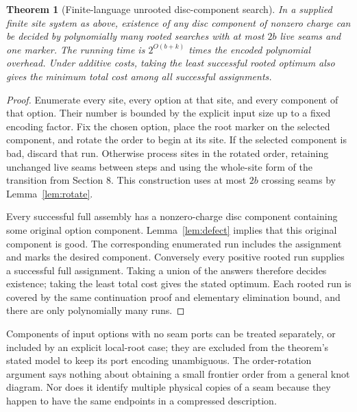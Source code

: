 \documentclass[11pt,letterpaper]{article}
\newtheorem{theorem}{Theorem}[section]
\theoremstyle{definition}
\begin{document}
\begin{theorem}[Finite-language unrooted disc-component search]\label{thm:unrooted}
In a supplied finite site system as above, existence of any disc component of nonzero charge can be decided by polynomially many rooted searches with at most $2b$ live seams and one marker. The running time is $2^{O(b+k)}$ times the encoded polynomial overhead. Under additive costs, taking the least successful rooted optimum also gives the minimum total cost among all successful assignments.
\end{theorem}
\begin{proof}
Enumerate every site, every option at that site, and every component of that option. Their number is bounded by the explicit input size up to a fixed encoding factor. Fix the chosen option, place the root marker on the selected component, and rotate the order to begin at its site. If the selected component is bad, discard that run. Otherwise process sites in the rotated order, retaining unchanged live seams between steps and using the whole-site form of the transition from Section 8. This construction uses at most $2b$ crossing seams by Lemma~\ref{lem:rotate}.

Every successful full assembly has a nonzero-charge disc component containing some original option component. Lemma~\ref{lem:defect} implies that this original component is good. The corresponding enumerated run includes the assignment and marks the desired component. Conversely every positive rooted run supplies a successful full assignment. Taking a union of the answers therefore decides existence; taking the least total cost gives the stated optimum. Each rooted run is covered by the same continuation proof and elementary elimination bound, and there are only polynomially many runs.
\end{proof}

Components of input options with no seam ports can be treated separately, or included by an explicit local-root case; they are excluded from the theorem's stated model to keep its port encoding unambiguous. The order-rotation argument says nothing about obtaining a small frontier order from a general knot diagram. Nor does it identify multiple physical copies of a seam because they happen to have the same endpoints in a compressed description.
\end{document}
